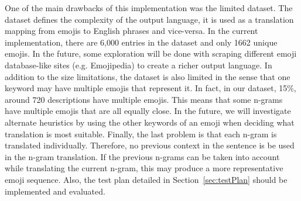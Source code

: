 \documentclass{article}[10]
\begin{document}
One of the main drawbacks of this implementation was the
limited dataset. The dataset defines the complexity of the output
language, it is used as a translation mapping from emojis to English
phrases and vice-versa. In the current implementation, there are 6,000
entries in the dataset and only 1662 unique emojis. In the future, some
exploration will be done with scraping different emoji database-like
sites (e.g. Emojipedia) to create a richer output language. In addition
to the size limitations, the dataset is also limited in the sense that
one keyword may have multiple emojis that represent it. In fact, in our
dataset, 15\%, around 720 descriptions have multiple emojis. This means
that some n-grams have multiple emojis that are all equally close. In
the future, we will investigate alternate heuristics by using the other
keywords of an emoji when deciding what translation is most suitable.
Finally, the last problem is that each n-gram is translated
individually. Therefore, no previous context in the sentence is be used
in the n-gram translation. If the previous n-grams can be taken into
account while translating the current n-gram, this may produce a more
representative emoji sequence. Also, the test plan detailed in
Section~\ref{sec:testPlan} should be implemented and
evaluated.

\makeatother


\end{document}
